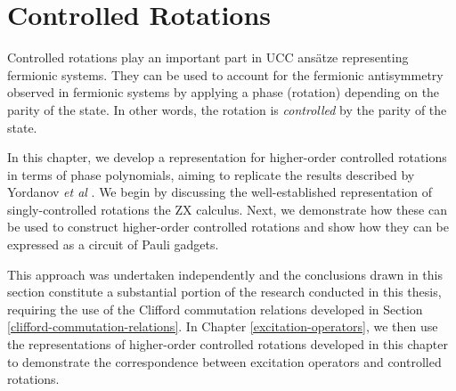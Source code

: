 \chapter{Controlled Rotations}%
\label{controlled-rotations}

Controlled rotations play an important part in UCC ansätze representing fermionic systems. They can be used to account for the fermionic antisymmetry observed in fermionic systems by applying a phase (rotation) depending on the parity of the state. In other words, the rotation is \textit{controlled} by the parity of the state.

In this chapter, we develop a representation for higher-order controlled rotations in terms of phase polynomials, aiming to replicate the results described by Yordanov \textit{et al} \cite{Yordanov2020}. We begin by discussing the well-established representation of singly-controlled rotations the ZX calculus. Next, we demonstrate how these can be used to construct higher-order controlled rotations and show how they can be expressed as a circuit of Pauli gadgets.

This approach was undertaken independently and the conclusions drawn in this section constitute a substantial portion of the research conducted in this thesis, requiring the use of the Clifford commutation relations developed in Section \ref{clifford-commutation-relations}. In Chapter \ref{excitation-operators}, we then use the representations of higher-order controlled rotations developed in this chapter to demonstrate the correspondence between excitation operators and controlled rotations.
